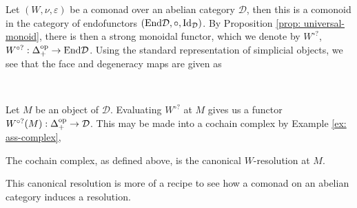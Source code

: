 \documentclass[../thesis.tex]{subfiles}
\begin{document}
        Let $(W, \nu, \varepsilon)$ be a comonad over an abelian category $\mathcal{D}$, then this is a comonoid in the category of endofunctors $(\tt{End}\mathcal{D}, \circ, \tt{Id}_\mathcal{D})$. By Proposition \ref{prop: universal-monoid}, there is then a strong monoidal functor, which we denote by $W^{\circ ?}$, $W^{\circ ?}: \Delta_+^{\tt{op}} \rightarrow \tt{End}\mathcal{D}$. Using the standard representation of simplicial objects, we see that the face and degeneracy maps are given as
        \begin{center}
             \\
        \end{center}
        Let $M$ be an object of $\mathcal{D}$. Evaluating $W^{\circ ?}$ at $M$ gives us a functor $W^{\circ ?}(M) : \Delta^{\tt{op}}_+ \rightarrow \mathcal{D}$. This may be made into a cochain complex by Example \ref{ex: ass-complex},
        \begin{center}
        \end{center}

        \begin{definition}
            The cochain complex, as defined above, is the canonical $W$-resolution at $M$.
        \end{definition}

        This canonical resolution is more of a recipe to see how a comonad on an abelian category induces a resolution.
\end{document}
